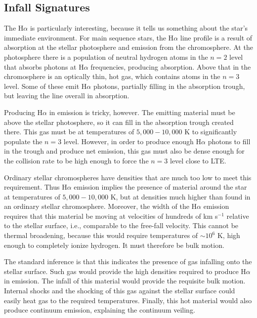\subsection{Infall Signatures}

The H$\alpha$ is particularly interesting, because it tells us something about the star's immediate environment. For main sequence stars, the H$\alpha$ line profile is a result of absorption at the stellar photosphere and emission from the chromosphere. At the photosphere there is a population of neutral hydrogen atoms in the $n=2$ level that absorbs photons at H$\alpha$ frequencies, producing absorption. Above that in the chromosphere is an optically thin, hot gas, which contains atoms in the $n=3$ level. Some of these emit H$\alpha$ photons, partially filling in the absorption trough, but leaving the line overall in absorption.

Producing H$\alpha$ in emission is tricky, however. The emitting material must be above the stellar photosphere, so it can fill in the absorption trough created there. This gas must be at temperatures of $5,000-10,000$ K to significantly populate the $n=3$ level. However, in order to produce enough H$\alpha$ photons to fill in the trough and produce net emission, this gas must also be dense enough for the collision rate to be high enough to force the $n=3$ level close to LTE.

Ordinary stellar chromospheres have densities that are much too low to meet this requirement. Thus H$\alpha$ emission implies the presence of material around the star at temperatures of  $5,000-10,000$ K, but at densities much higher than found in an ordinary stellar chromosphere. Moreover, the width of the H$\alpha$ emission requires that this material be moving at velocities of hundreds of km s$^{-1}$ relative to the stellar surface, i.e., comparable to the free-fall velocity. This cannot be thermal broadening, because this would require temperatures of $\sim 10^6$ K, high enough to completely ionize hydrogen. It must therefore be bulk motion.

The standard inference is that this indicates the presence of gas infalling onto the stellar surface. Such gas would provide the high densities required to produce H$\alpha$ in emission. The infall of this material would provide the requisite bulk motion. Internal shocks and the shocking of this gas against the stellar surface could easily heat gas to the required temperatures. Finally, this hot material would also produce continuum emission, explaining the continuum veiling.

